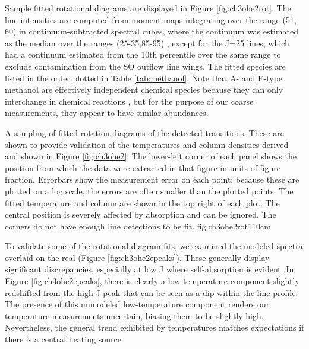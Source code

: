 \documentclass{emulateapj}
\begin{document}
Sample fitted rotational diagrams are displayed in Figure \ref{fig:ch3ohe2rot}.
The line intensities are computed from moment maps integrating over the range
(51, 60) \kms in continuum-subtracted spectral cubes, where the continuum
was estimated as the median over the ranges (25-35,85-95) \kms, except
for the J=25 lines, which had a continuum estimated from the 10th percentile
over the same range to exclude contamination from the SO outflow line wings.
The fitted species are listed in the order plotted in Table \ref{tab:methanol}.
Note that A- and E-type methanol are effectively independent chemical species
because they can only interchange in chemical reactions \citep{Rabli2010c},
but for the purpose of our coarse measurements, they appear to have similar
abundances.

{A sampling of fitted rotation diagrams of the detected \methanol transitions.
These are shown to provide validation of the temperatures and column densities
derived and shown in Figure \ref{fig:ch3ohe2}.  The lower-left corner of each
panel shows the position from which the data were extracted in that figure in
units of figure fraction.  Errorbars show the measurement error on each point;
because these are plotted on a log scale, the errors are often smaller than
the plotted points.  The fitted temperature and
column are shown in the top right of each plot.
The central position is severely affected by absorption and can be ignored.
The corners do not have enough line detections to be fit.
}{fig:ch3ohe2rot}{1}{10cm}



To validate some of the rotational diagram fits, we examined the modeled
spectra overlaid on the real (Figure \ref{fig:ch3ohe2epeaks}).  These generally
display significant discrepancies, especially at low J where self-absorption is
evident.  In Figure \ref{fig:ch3ohe2epeaks}, there is clearly a low-temperature
component slightly redshifted from the high-J peak that can be seen as a dip
within the line profile.  The presence of this unmodeled low-temperature
component renders our \methanol temperature measurements uncertain, biasing
them to be slightly high.  Nevertheless,
the general trend exhibited by \methanol temperatures matches expectations
if there is a central heating source.
\end{document}
